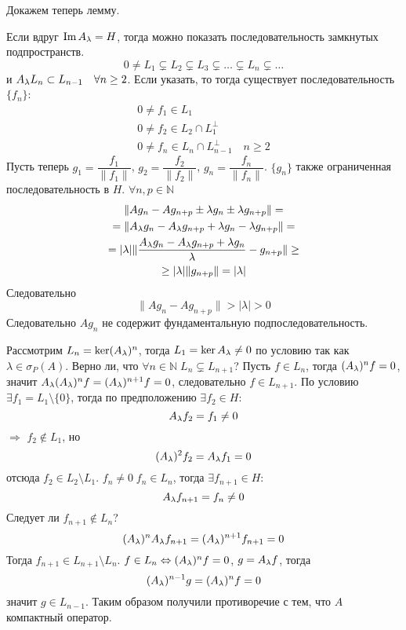 \documentclass[14pt]{extarticle}
\begin{document}
Докажем теперь лемму.
\begin{Proof}
    Если вдруг $\Im \Al = H$, тогда можно показать последовательность
    замкнутых подпространств.
    $$
    0 \ne L_1 \varsubsetneq L_2 \varsubsetneq L_3 \varsubsetneq \dots 
    \varsubsetneq L_n \varsubsetneq \dots
    $$
    и $\Al L_n \subset L_{n - 1}\quad \forall n \ge 2$.
    Если указать, то тогда существует последовательность $\{f_n\}$:
    \begin{gather*}
        0 \ne f_1 \in L_1\\
        0 \ne f_2 \in L_2 \cap L_1^\perp\\
        0 \ne f_n \in L_n \cap L_{n - 1}^\perp\quad n \ge 2
    \end{gather*}
    Пусть теперь $g_1 = \dfrac{f_1}{\|f_1\|}$, $g_2 = \dfrac{f_2}{\|f_2\|}$, 
    $g_n = \dfrac{f_n}{\|f_n\|}$.
    $\{g_n\}$ также ограниченная последовательность в $H$.
    $\forall n, p \in \mathbb N$
    \begin{multline*}
        \|Ag_n - Ag_{n + p} \pm \lambda g_n \pm \lambda g_{n + p}\| =\\
        = \|{\Al} g_n - {\Al} g_{n + p} + \lambda g_n - \lambda g_{n + p}\| =\\
        = |\lambda|\|\dfrac{{\Al} g_n - {\Al} g_{n + p} + \lambda g_n}{\lambda} -
        g_{n + p}\| \ge\\\ge |\lambda| \|g_{n + p}\| = |\lambda|
    \end{multline*}
    Следовательно
    $$
    \|A g_n - A g_{n + p}\| > |\lambda| > 0
    $$
    Следовательно $A g_n$ не содержит фундаментальную подпоследовательность.
    
    Рассмотрим $L_n = \ker(\Al)^n$, тогда $L_1 = \ker \Al \ne 0$ по условию
    так как $\lambda \in \sigma_P(A)$.
    Верно ли, что $\forall n \in \mathbb{N}\; L_n \varsubsetneq L_{n + 1}$?
    Пусть $f \in L_n$, тогда $(\Al)^nf = 0$, значит $\Al (\Al)^n f = (\Al)^{n
    + 1}f = 0$, следовательно $f \in L_{n + 1}$.
    По условию $\exists f_1 = L_1 \setminus \{0\}$, тогда по предположению
    $\exists f_2 \in H$:
    $$
    \Al f_2 = f_1 \ne 0
    $$
    $\Rightarrow$ $f_2 \notin L_1$, но
    $$
    (\Al)^2 f_2 = \Al f_1 = 0
    $$
    отсюда $f_2 \in L_2 \setminus L_1$.
    $f_n \ne 0\; f_n \in L_n$, тогда $\exists f_{n + 1} \in H$:
    $$
    \Al f_{n + 1} = f_n \ne 0
    $$
    Следует ли $f_{n + 1} \notin L_n$?
    $$
    (\Al)^n \Al f_{n + 1} = (\Al)^{n + 1} f_{n + 1} = 0
    $$
    Тогда $f_{n + 1} \in L_{n + 1}\setminus L_n$.
    $f \in L_n \Leftrightarrow (\Al)^n f = 0$, $g = \Al f$, тогда
    $$
    (\Al)^{n - 1}g = (\Al)^n f = 0
    $$
    значит $g \in L_{n - 1}$.
    Таким образом получили противоречие с тем, что $A$ компактный оператор.
\end{Proof}
\end{document}
